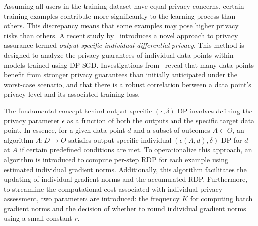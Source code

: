 Assuming all users in the training dataset have equal privacy concerns, certain training examples contribute more significantly to the learning process than others. This discrepancy means that some examples may pose higher privacy risks than others. A recent study by~\cite{individAccnt} introduces a novel approach to privacy assurance termed {\em output-specific individual differential privacy}. This method is designed to analyze the privacy guarantees of individual data points within models trained using DP-SGD. Investigations from~\cite{individAccnt} reveal that many data points benefit from stronger privacy guarantees than initially anticipated under the worst-case scenario, and that there is a robust correlation between a data point's privacy level and its associated training loss.

The fundamental concept behind output-specific $(\epsilon, \delta)$-DP involves defining the privacy parameter $\epsilon$ as a function of both the outputs and the specific target data point. In essence, for a given data point $d$ and a subset of outcomes $A \subset O$, an algorithm $A : D \rightarrow O$ satisfies output-specific individual $(\epsilon(A, d), \delta)$-DP for $d$ at $A$ if certain predefined conditions are met. To operationalize this approach, an algorithm is introduced to compute per-step RDP for each example using estimated individual gradient norms. Additionally, this algorithm facilitates the updating of individual gradient norms and the accumulated RDP. Furthermore, to streamline the computational cost associated with individual privacy assessment, two parameters are introduced: the frequency $K$ for computing batch gradient norms and the decision of whether to round individual gradient norms using a small constant $r$.